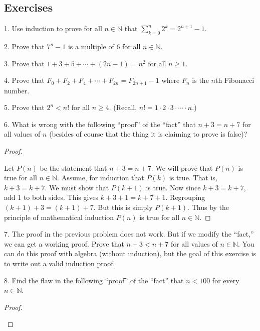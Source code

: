 \documentclass[10pt,]{book}
\theoremstyle{plain}
\theoremstyle{definition}
\theoremstyle{definition}
\theoremstyle{definition}
\numberwithin{equation}{chapter}
\def\d{\displaystyle}
\def\N{\mathbb N}
\newcommand{\lt}{ < }
\begin{document}
\subsection[Exercises]{Exercises}\label{exercises-16}
\begin{exerciselist}
\item[1.]\hypertarget{exercise-168}{}
Use induction to prove for all \(n \in \N\) that \(\d\sum_{k=0}^n 2^k = 2^{n+1} - 1\).
%
\par\smallskip
\item[2.]\hypertarget{exercise-169}{}
Prove that \(7^n - 1\) is a multiple of 6 for all \(n \in \N\).
%
\par\smallskip
\item[3.]\hypertarget{exercise-170}{}
Prove that \(1 + 3 + 5 + \cdots + (2n-1) = n^2\) for all \(n \ge 1\).
%
\par\smallskip
\item[4.]\hypertarget{exercise-171}{}
Prove that \(F_0 + F_2 + F_4 + \cdots + F_{2n} = F_{2n+1} - 1\) where \(F_n\) is the \(n\)th Fibonacci number.
%
\par\smallskip
\item[5.]\hypertarget{exercise-172}{}
Prove that \(2^n \lt  n!\) for all \(n \ge 4\). (Recall, \(n! = 1\cdot 2 \cdot 3 \cdot \cdots\cdot n\).)
%
\par\smallskip
\item[6.]\hypertarget{exercise-173}{}
What is wrong with the following ``proof'' of the ``fact'' that \(n+3 = n+7\) for all values of \(n\) (besides of course that the thing it is claiming to prove is false)?
%
\begin{proof}\hypertarget{proof-24}{}

Let \(P(n)\) be the statement that \(n + 3 = n + 7\). We will prove that \(P(n)\) is true for all \(n \in \N\). Assume, for induction that \(P(k)\) is true. That is, \(k+3 = k+7\). We must show that \(P(k+1)\) is true. Now since \(k + 3 = k + 7\), add 1 to both sides. This gives \(k + 3 + 1 = k + 7 + 1\). Regrouping \((k+1) + 3 = (k+1) + 7\). But this is simply \(P(k+1)\). Thus by the principle of mathematical induction \(P(n)\) is true for all \(n \in \N\).
%
\end{proof}
\par\smallskip
\item[7.]\hypertarget{exercise-174}{}
The proof in the previous problem does not work. But if we modify the ``fact,'' we can get a working proof. Prove that \(n + 3 \lt  n + 7\) for all values of \(n \in \N\). You can do this proof with algebra (without induction), but the goal of this exercise is to write out a valid induction proof.
%
\par\smallskip
\item[8.]\hypertarget{exercise-175}{}
Find the flaw in the following ``proof'' of the ``fact'' that \(n \lt  100\) for every \(n \in \N\).
%
\begin{proof}\hypertarget{proof-26}{}


\end{proof}
\end{exerciselist}
\end{document}
